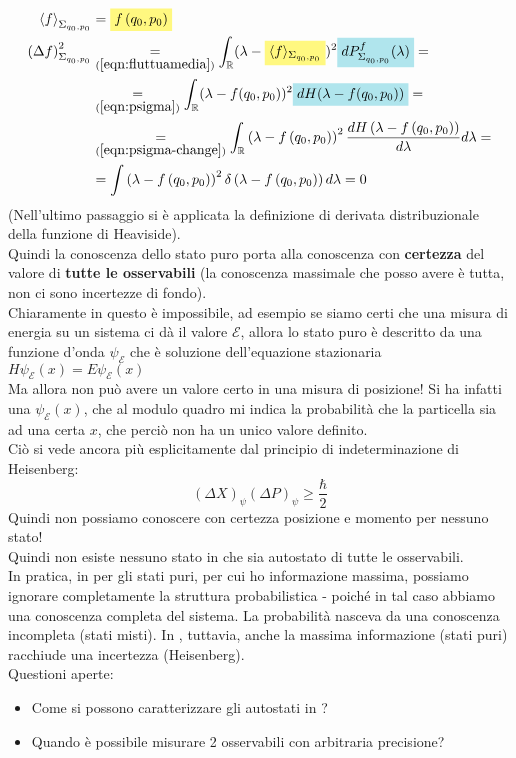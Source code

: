 \documentclass[FisicaTeorica.tex]{subfiles}
\begin{document}
\begin{align*}
\left\langle f\right\rangle_{\Sigma_{q_0,p_0}}&=\hlc{Yellow}{f\left(q_0,p_0\right)}\\
\left(\Delta f\right)^2_{\Sigma_{q_0,p_0}}&\underset{(\ref{eqn:fluttuamedia})}{=}\int_\bb{R} (\lambda - \hlc{Yellow}{\langle f \rangle_{\Sigma_{q_0,p_0}}})^2 \hlc{SkyBlue}{dP_{\Sigma_{q_0, p_0}}^{f}(\lambda)} = \\
&\underset{(\ref{eqn:psigma})}{=} \int_\bb{R} (\lambda - f(q_0,p_0))^2 \hlc{SkyBlue}{dH(\lambda- f(q_0,p_0))} =\\
&\underset{(\ref{eqn:psigma-change})}{=}\int_\bb{R} \left(\lambda-f\left(q_0,p_0\right)\right)^2 \frac{dH\left(\lambda-f\left(q_0,p_0\right)\right)}{d\lambda} d\lambda =\\
&=\int\left(\lambda-f\left(q_0,p_0\right)\right)^2\delta\left(\lambda-f\left(q_0,p_0\right)\right)d\lambda=0
\end{align*}
(Nell'ultimo passaggio si è applicata la definizione di derivata distribuzionale della funzione di Heaviside).\\
Quindi la conoscenza dello stato puro porta alla conoscenza con \textbf{certezza} del valore di \textbf{tutte le osservabili} (la conoscenza massimale che posso avere è tutta, non ci sono incertezze di fondo).\\
Chiaramente in \MQ questo è impossibile, ad esempio se siamo certi che una misura di energia su un sistema ci dà il valore $\mathcal{E}$, allora lo stato puro è descritto da una funzione d'onda $\psi_\mathcal{E}$ che è soluzione dell'equazione stazionaria
$H\psi_\mathcal{E}\left(x\right)=E\psi_\mathcal{E}(x)$\\
Ma allora non può avere un valore certo in una misura di posizione! Si ha infatti una $\psi_\mathcal{E}(x)$, che al modulo quadro mi indica la probabilità che la particella sia ad una certa $x$, che perciò non ha un unico valore definito.\\

Ciò si vede ancora più esplicitamente dal principio di indeterminazione di Heisenberg:
\[
\left(\Delta X\right)_\psi\left(\Delta P\right)_\psi\geq\frac{\hbar}{2}
\]
Quindi non possiamo conoscere con certezza posizione e momento per nessuno stato!\\
Quindi non esiste nessuno stato in \MQ che sia autostato di tutte le osservabili.\\
In pratica, in \MC per gli stati puri, per cui ho informazione massima, possiamo ignorare completamente la struttura probabilistica - poiché in tal caso abbiamo una conoscenza completa del sistema. La probabilità nasceva da una conoscenza incompleta (stati misti).
In \MQ, tuttavia, anche la massima informazione (stati puri) racchiude una incertezza (Heisenberg).\\
Questioni aperte:
\begin{itemize}
    \item Come si possono caratterizzare gli autostati in \MQ?
    \item Quando è possibile misurare 2 osservabili con arbitraria precisione?
\end{itemize}
\end{document}
